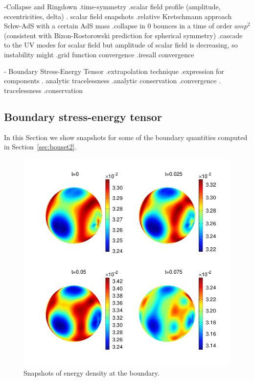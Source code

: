 \documentclass[12pt]{iopart} %
\begin{document}
-Collapse and Ringdown .time-symmetry .scalar field profile (amplitude, eccentricities, delta) . scalar field snapshots .relative Kretschmann approach Schw-AdS with a certain AdS mass .collapse in 0 bounces in a time of order $amp^2$ (consistent with Bizon-Rostorowski prediction for spherical symmetry) .cascade to the UV modes for scalar field but amplitude of scalar field is decreasing, so instability might .grid function convergence .iresall convergence

- Boundary Stress-Energy Tensor .extrapolation technique .expression for components . analytic tracelessness .analytic conservation .convergence . tracelessness .conservation

\subsection{Boundary stress-energy tensor}
\label{sec:resbouset}

In this Section we show snapshots for some of the boundary quantities computed in Section~\ref{sec:bouset2}.

\begin{figure}[h]
        \centering
        \includegraphics[width=5.0in,clip=true]{plots/bdyplots/L3/bdyenergydensity/sphereplots_bdyenergydensity_L3_2by2.png}
\parbox{5.0in}{\caption{Snapshots of energy density at the boundary.
        }\label{fig:snapshotsenergydensity}}
\end{figure}
\end{document}
